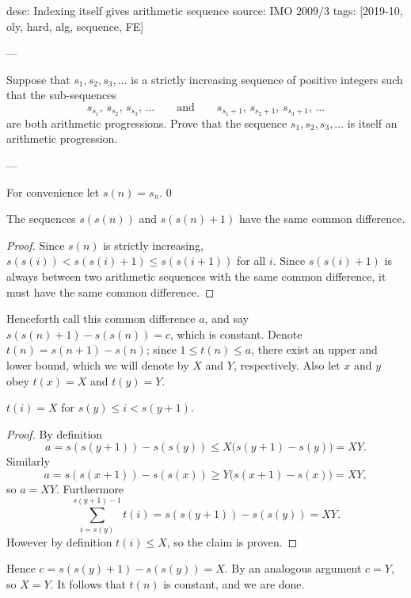 desc: Indexing itself gives arithmetic sequence
source: IMO 2009/3
tags: [2019-10, oly, hard, alg, sequence, FE]

---

Suppose that $ s_1,s_2,s_3, \ldots$ is a strictly increasing sequence of positive integers such that the sub-sequences\[s_{s_1},\, s_{s_2},\, s_{s_3},\, \ldots\qquad\text{and}\qquad s_{s_1+1},\, s_{s_2+1},\, s_{s_3+1},\, \ldots\]are both arithmetic progressions. Prove that the sequence $ s_1, s_2, s_3, \ldots$ is itself an arithmetic progression.

---

For convenience let $s(n)=s_n$.
\setcounter{iclaim}0
\begin{iclaim}
    The sequences $s(s(n))$ and $s(s(n)+1)$ have the same common difference.
\end{iclaim}
\begin{proof}
    Since $s(n)$ is strictly increasing, $s(s(i))<s(s(i)+1)\le s(s(i+1))$ for all $i$. Since $s(s(i)+1)$ is always between two arithmetic sequences with the same common difference, it must have the same common difference.
\end{proof}

Henceforth call this common difference $a$, and say $s(s(n)+1)-s(s(n))=c$, which is constant. Denote $t(n)=s(n+1)-s(n)$; since $1\le t(n)\le a$, there exist an upper and lower bound, which we will denote by $X$ and $Y$, respectively. Also let $x$ and $y$ obey $t(x)=X$ and $t(y)=Y$.
\begin{iclaim}
    $t(i)=X$ for $s(y)\le i<s(y+1)$.
\end{iclaim}
\begin{proof}
    By definition \[a=s(s(y+1))-s(s(y))\le X\big(s(y+1)-s(y)\big)=XY.\]
    Similarly \[a=s(s(x+1))-s(s(x))\ge Y\big(s(x+1)-s(x)\big)=XY,\]
    so $a=XY$. Furthermore \[\sum_{i=s(y)}^{s(y+1)-1}t(i)=s(s(y+1))-s(s(y))=XY.\]
    However by definition $t(i)\le X$, so the claim is proven.
\end{proof}

Hence $c=s(s(y)+1)-s(s(y))=X$. By an analogous argument $c=Y$, so $X=Y$. It follows that $t(n)$ is constant, and we are done.
